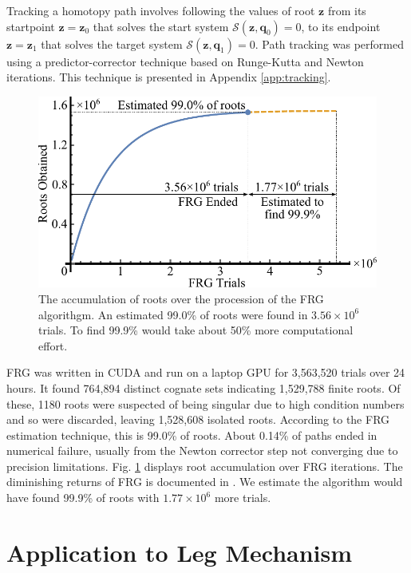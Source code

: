 \documentclass[journal]{IEEEtran}
\begin{document}
Tracking a homotopy path involves following the values of root $\mathbf{z}$ from its startpoint $\mathbf{z} = \mathbf{z}_0$ that solves the start system $\mathcal{S}(\mathbf{z},\mathbf{q}_0)=0$, to its endpoint $\mathbf{z} = \mathbf{z}_1$ that solves the target system $\mathcal{S}(\mathbf{z},\mathbf{q}_1)=0$.
Path tracking was performed using a predictor-corrector technique based on Runge-Kutta and Newton iterations.  
This technique is presented in Appendix \ref{app:tracking}.


\begin{figure}[!b]
\centering
\includegraphics[scale=0.6]{frg_results}
\caption{The accumulation of roots over the procession of the FRG algorithgm.  An estimated 99.0\% of roots were found in $3.56 \times 10^6$ trials.  To find 99.9\% would take about 50\% more computational effort.}
\label{frg_results}
\end{figure}


FRG was written in CUDA and run on a laptop GPU for 3,563,520 trials over 24 hours.
It found 764,894 distinct cognate sets indicating 1,529,788 finite roots.
Of these, 1180 roots were suspected of being singular due to high condition numbers and so were discarded, leaving 1,528,608 isolated roots.
According to the FRG estimation technique, this is 99.0\% of roots.  About 0.14\% of paths ended in numerical failure, usually from the Newton corrector step not converging due to precision limitations.  Fig. \ref{frg_results} displays root accumulation over FRG iterations.  The diminishing returns of FRG is documented in \cite{plecnikStudyFindingFinite2017}.  We estimate the algorithm would have found 99.9\% of roots with $1.77\times 10^6$ more trials.



\section{Application to Leg Mechanism}
\label{sec:leg_app}
\end{document}
